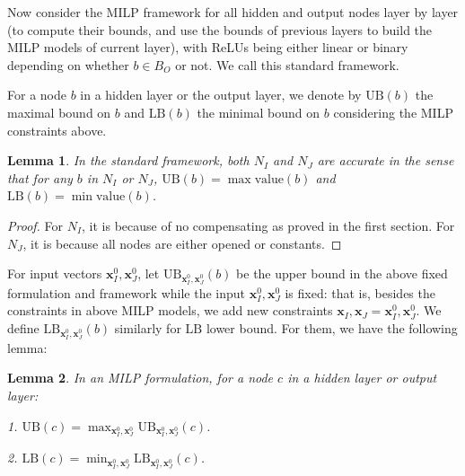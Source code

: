 \documentclass[]{article}
\newtheorem{lemma}{Lemma}
\theoremstyle{definition}
\newtheorem{definition}{Definition}
\newcommand{\Val}{\mathrm{value}}
\newcommand{\UB}{\mathrm{UB}}
\newcommand{\LB}{\mathrm{LB}}
\newcommand{\B}{\mathrm{B}}
\begin{document}
			Now consider the MILP framework for all hidden and output nodes layer by layer (to compute their bounds, and use the bounds of previous layers to build the MILP models of current layer), with ReLUs being either linear or binary depending on whether $b \in B_{O}$ or not. We call this standard framework.
			
			For a node $b$ in a hidden layer or the output layer, we denote by $\UB(b)$ the maximal bound on $b$ and $\LB(b)$ the minimal bound on $b$ considering the MILP constraints above.
			
			
			\begin{lemma}
				In the standard framework, both $N_I$ and $N_J$ are accurate in the sense that for any $b$ in $N_I$ or $N_J$, $\UB(b)=\max\Val(b)$ and $\LB(b)=\min\Val(b)$.
			\end{lemma}
			
			\begin{proof}
				For $N_I$, it is because of no compensating as proved in the first section. For $N_J$, it is because all nodes are either opened or constants.
			\end{proof}
			
			
			
			
			For input vectors $\boldsymbol{x}^0_I,\boldsymbol{x}^0_J$, let $\UB_{\boldsymbol{x}^0_I,\boldsymbol{x}^0_J}(b)$ be the upper bound in the above fixed formulation and framework while the input $\boldsymbol{x}^0_I,\boldsymbol{x}^0_J$ is fixed: that is, besides the constraints in above MILP models, we add new constraints $\boldsymbol{x}_I,\boldsymbol{x}_J=\boldsymbol{x}^0_I,\boldsymbol{x}^0_J$. We  define $\LB_{\boldsymbol{x}^0_I,\boldsymbol{x}^0_J}(b)$ similarly for $\LB$ lower bound. For them, we have the following lemma:
			
			\begin{lemma} In an MILP formulation, for a node $c$ in a hidden layer or output layer:
				
				1. $\UB(c)=\max_{\boldsymbol{x}^0_I,\boldsymbol{x}^0_J}\UB_{\boldsymbol{x}^0_I,\boldsymbol{x}^0_J}(c)$. 
				
				2. $\LB(c)=\min_{\boldsymbol{x}^0_I,\boldsymbol{x}^0_J}\LB_{\boldsymbol{x}^0_I,\boldsymbol{x}^0_J}(c)$. 
			\end{lemma}
			
\end{document}
